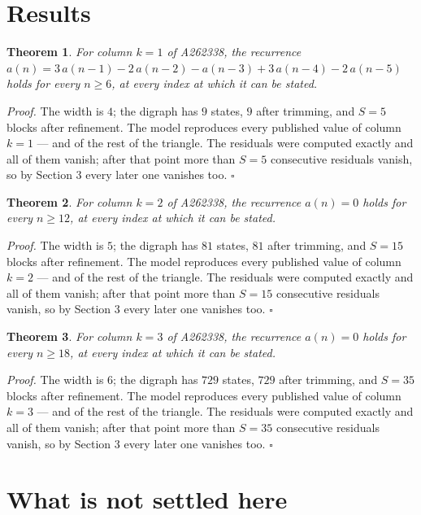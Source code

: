 \documentclass[11pt]{article}
\newtheorem{theorem}{Theorem}
\theoremstyle{definition}
\begin{document}
\section{Results}

\begin{theorem} For column $k = 1$ of A262338, the recurrence $a(n) = 3\,a(n-1) - 2\,a(n-2) - a(n-3) + 3\,a(n-4) - 2\,a(n-5)$ holds for every $n \ge 6$, at every index at which it can be stated.\end{theorem}

{\itshape Proof.} The width is $4$; the digraph has $9$ states, $9$ after trimming, and $S = 5$ blocks after refinement. The model reproduces every published value of column $k = 1$ --- and of the rest of the triangle. The residuals were computed exactly and all of them vanish; after that point more than $S = 5$ consecutive residuals vanish, so by Section 3 every later one vanishes too. $\square$

\begin{theorem} For column $k = 2$ of A262338, the recurrence $a(n) = 0$ holds for every $n \ge 12$, at every index at which it can be stated.\end{theorem}

{\itshape Proof.} The width is $5$; the digraph has $81$ states, $81$ after trimming, and $S = 15$ blocks after refinement. The model reproduces every published value of column $k = 2$ --- and of the rest of the triangle. The residuals were computed exactly and all of them vanish; after that point more than $S = 15$ consecutive residuals vanish, so by Section 3 every later one vanishes too. $\square$

\begin{theorem} For column $k = 3$ of A262338, the recurrence $a(n) = 0$ holds for every $n \ge 18$, at every index at which it can be stated.\end{theorem}

{\itshape Proof.} The width is $6$; the digraph has $729$ states, $729$ after trimming, and $S = 35$ blocks after refinement. The model reproduces every published value of column $k = 3$ --- and of the rest of the triangle. The residuals were computed exactly and all of them vanish; after that point more than $S = 35$ consecutive residuals vanish, so by Section 3 every later one vanishes too. $\square$

\section{What is not settled here}
\end{document}
